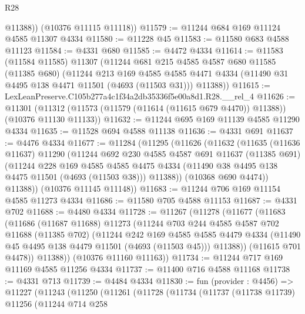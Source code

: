 \begin{lexlean}{R28}
\begin{coremodule}
          @11388))
      (@10376 @11115 @11118))
@11579 := @11244 @684 @169 @11124 @4585 @11307 @4334
@11580 := @11228 @45
@11583 := @11580 @683 @4588 @11123
@11584 := @4331 @680
@11585 := @4472 @4334
@11614 := @11583
    (@11584 @11585)
    @11307
    (@11244
      @681
      @215
      @4585
      @4587
      @680
      @11585
      (@11385 @680)
      (@11244
        @213
        @169
        @4585
        @4585
        @4471
        @4334
        (@11490 @31 @4495 @138 @4471 @11501 (@4693 (@11503 @31)))
        @11388))
@11615 := LexLeanPreserve.C105b277a4c1f34a2db35336f5e00a8d1.R28.__rel_4
@11626 := @11301
    (@11312 (@11573 (@11579 (@11614 (@11615 @679 @4470)) @11388)) (@10376 @11130 @11133))
@11632 := @11244 @695 @169 @11139 @4585 @11290 @4334
@11635 := @11528 @694 @4588 @11138
@11636 := @4331 @691
@11637 := @4476 @4334
@11677 := @11284
    (@11295
      (@11626
        (@11632
          (@11635
            (@11636 @11637)
            @11290
            (@11244
              @692
              @230
              @4585
              @4587
              @691
              @11637
              (@11385 @691)
              (@11244
                @228
                @169
                @4585
                @4585
                @4475
                @4334
                (@11490 @38 @4495 @138 @4475 @11501 (@4693 (@11503 @38)))
                @11388))
            (@10368 @690 @4474))
          @11388))
      (@10376 @11145 @11148))
@11683 := @11244 @706 @169 @11154 @4585 @11273 @4334
@11686 := @11580 @705 @4588 @11153
@11687 := @4331 @702
@11688 := @4480 @4334
@11728 := @11267
    (@11278
      (@11677
        (@11683
          (@11686
            (@11687 @11688)
            @11273
            (@11244
              @703
              @244
              @4585
              @4587
              @702
              @11688
              (@11385 @702)
              (@11244
                @242
                @169
                @4585
                @4585
                @4479
                @4334
                (@11490 @45 @4495 @138 @4479 @11501 (@4693 (@11503 @45)))
                @11388))
            (@11615 @701 @4478))
          @11388))
      (@10376 @11160 @11163))
@11734 := @11244 @717 @169 @11169 @4585 @11256 @4334
@11737 := @11400 @716 @4588 @11168
@11738 := @4331 @713
@11739 := @4484 @4334
@11830 := fun (provider : @4456) =>
  @11227
    (@11243
      (@11250
        (@11261
          (@11728
            (@11734
              (@11737
                (@11738 @11739)
                @11256
                (@11244
                  @714
                  @258

\end{coremodule}
\end{lexlean}
